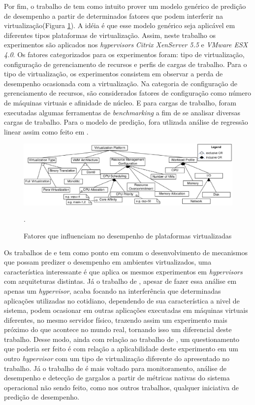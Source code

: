 Por fim, o trabalho de  tem como intuito prover um modelo genérico de predição de desempenho a partir de determinados fatores que podem interferir na virtualização(Figura \ref{influence_factors}). A idéia é que esse modelo genérico seja aplicável em diferentes tipos plataformas de virtualização. Assim, neste trabalho os experimentos são aplicados nos \textit{hypervisors } \textit{Citrix XenServer 5.5} e \textit{VMware ESX 4.0}. Os fatores categorizados para os experimentos foram: tipo de virtualização, configuração de gerenciamento de recursos e perfis de cargas de trabalho. Para o tipo de virtualização, os experimentos consistem em observar a perda de desempenho ocasionada com a virtualização. Na categoria de configuração de gerenciamento de recursos, são considerados fatores de configuração como número de máquinas virtuais e afinidade de núcleo. E para cargas de trabalho, foram executadas algumas ferramentas de \textit{benchmarking} a fim de se analisar diversas cargas de trabalho. Para o modelo de predição, fora utlizada análise de regressão linear assim como feito em . 

\begin{figure}[!htb]
\centering
\includegraphics [keepaspectratio=true,scale=0.50]{figuras/factors_influence.eps}
\caption{Fatores que influenciam no desempenho de plataformas virtualizadas}
\cite{huber2011}.
\label{influence_factors}
\end{figure} 

Os trabalhos de  e  tem como ponto em comum o desenvolvimento de mecanismos que possam predizer o desempenho em ambientes virtualizados, uma característica interessante é que  aplica os mesmos experimentos em \textit{hypervisors} com arquiteturas distintas. Já o trabalho de  , apesar de fazer essa análise em apenas um \textit{hypervisor}, acaba focando na interferência que determinadas aplicações utilizadas no cotidiano, dependendo de sua característica a nivel de sistema, podem ocasionar em outras aplicações executadas em máquinas virtuais diferentes, no mesmo servidor físico,  trazendo assim um experimento mais próximo do que acontece no mundo real, tornando isso um diferencial deste trabalho. Desse modo, ainda com relação ao trabalho de , um questionamento que poderia ser feito é com relação a aplicabilidade deste experimento em um outro \textit{hypervisor} com um tipo de virtualização diferente do apresentado no trabalho. Já o trabalho de  é mais voltado para monitoramento, análise de desempenho e detecção de gargalos a partir de métricas nativas do sistema operacional não sendo feito, como nos outros trabalhos, qualquer iniciativa de predição de desempenho.


